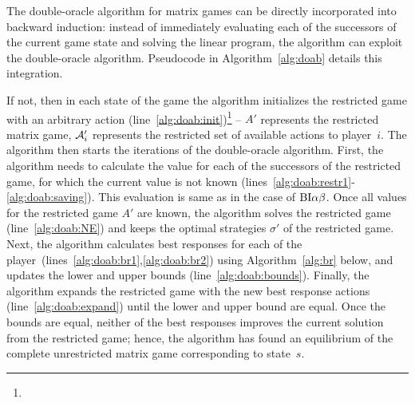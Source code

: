 The double-oracle algorithm for matrix games can be directly incorporated into backward induction: instead of immediately evaluating each of the successors of the current game state and solving the linear program, the algorithm can exploit the double-oracle algorithm. Pseudocode in Algorithm~\ref{alg:doab} details this integration.

If not, then in each state of the game the algorithm initializes the restricted game with an arbitrary action (line~\ref{alg:doab:init})\footnote{} -- $A'$ represents the restricted matrix game, $\mathcal{A}'_i$ represents the restricted set of available actions to player~$i$.
The algorithm then starts the iterations of the double-oracle algorithm.
First, the algorithm needs to calculate the value for each of the successors of the restricted game, for which the current value is not known (lines~\ref{alg:doab:restr1}-\ref{alg:doab:saving}). This evaluation is same as in the case of $\textrm{BI}\alpha\beta$. %
Once all values for the restricted game $A'$ are known, the algorithm solves the restricted game (line~\ref{alg:doab:NE}) and keeps the optimal strategies $\sigma'$ of the restricted game.
Next, the algorithm calculates best responses for each of the player~(lines~\ref{alg:doab:br1},\ref{alg:doab:br2}) using Algorithm~\ref{alg:br} below, and updates the lower and upper bounds (line~\ref{alg:doab:bounds}). Finally, the algorithm expands the restricted game with the new best response actions (line~\ref{alg:doab:expand}) until the lower and upper bound are equal.
Once the bounds are equal, neither of the best responses improves the current solution from the restricted game; hence, the algorithm has found an equilibrium of the complete unrestricted matrix game corresponding to state~$s$.

